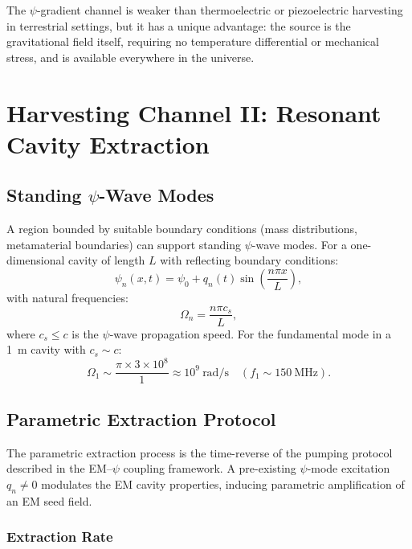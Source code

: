 \documentclass[aps,prd,twocolumn,showpacs,preprintnumbers,superscriptaddress,nofootinbib]{revtex4-2}
\begin{document}
The $\psi$-gradient channel is weaker than thermoelectric or piezoelectric
harvesting in terrestrial settings, but it has a unique advantage: the
source is the gravitational field itself, requiring no temperature
differential or mechanical stress, and is available everywhere in the
universe.

\section{Harvesting Channel II: Resonant Cavity Extraction}\label{sec:cavity}

\subsection{Standing $\psi$-Wave Modes}\label{sec:standing}

A region bounded by suitable boundary conditions (mass distributions,
metamaterial boundaries) can support standing $\psi$-wave modes.  For a
one-dimensional cavity of length $L$ with reflecting boundary conditions:
\begin{equation}
\psi_n(x,t) = \psi_0 + q_n(t)\sin\!\left(\frac{n\pi x}{L}\right),
\end{equation}
with natural frequencies:
\begin{equation}\label{eq:psi-freqs}
\Omega_n = \frac{n\pi c_s}{L},
\end{equation}
where $c_s \leq c$ is the $\psi$-wave propagation speed.  For the
fundamental mode in a 1~m cavity with $c_s \sim c$:
\begin{equation}
\Omega_1 \sim \frac{\pi\times 3\times 10^8}{1} \approx 10^9~\text{rad/s} \quad (f_1\sim 150~\text{MHz}).
\end{equation}

\subsection{Parametric Extraction Protocol}\label{sec:parametric}

The parametric extraction process is the time-reverse of the pumping
protocol described in the EM--$\psi$ coupling framework.  A pre-existing
$\psi$-mode excitation $q_n \neq 0$ modulates the EM cavity properties,
inducing parametric amplification of an EM seed field.

\subsubsection{Extraction Rate}
\end{document}

